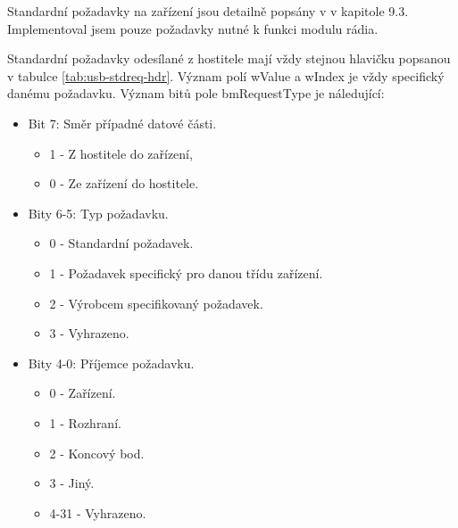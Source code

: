Standardní požadavky na zařízení jsou detailně popsány v \cite{usb-spec} v kapitole 9.3. Implementoval jsem pouze požadavky nutné k funkci modulu rádia.

Standardní požadavky odesílané z hostitele mají vždy stejnou hlavičku popsanou v tabulce \ref{tab:usb-stdreq-hdr}. Význam polí wValue a wIndex je vždy specifický danému požadavku. Význam bitů pole bmRequestType je náledující:

\begin{itemize}
\item Bit 7: Směr případné datové části.
	\begin{itemize}
	\item 1 - Z hostitele do zařízení, 
	\item 0 - Ze zařízení do hostitele.
	\end{itemize}
	
\item Bity 6-5: Typ požadavku.
	\begin{itemize}
	\item 0 - Standardní požadavek.
	\item 1 - Požadavek specifický pro danou třídu zařízení.
	\item 2 - Výrobcem specifikovaný požadavek.
	\item 3 - Vyhrazeno.
	\end{itemize}
	
\item Bity 4-0: Příjemce požadavku.
	\begin{itemize}
	\item 0 - Zařízení.
	\item 1 - Rozhraní.
	\item 2 - Koncový bod.
	\item 3 - Jiný.
	\item 4-31 - Vyhrazeno.
	\end{itemize}
	
\end{itemize}


